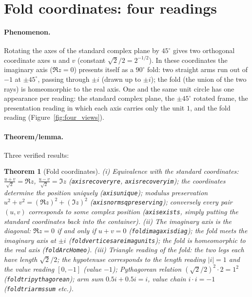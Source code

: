 \documentclass{article}
\renewcommand{\_}{\underscoreOrig\allowbreak}
\newtheorem{theorem}{Theorem}[section]
\begin{document}
\section{Fold coordinates: four readings}
\label{sec:fold}

\paragraph{Phenomenon.} Rotating the axes of the standard complex plane
by $45^\circ$ gives two orthogonal coordinate axes $u$ and $v$ (constant
$\sqrt2/2=2^{-1/2}$). In these coordinates the imaginary axis
($\Re z=0$) presents itself as a $90^\circ$ fold: two straight arms run
out of $-1$ at $\pm45^\circ$, passing through $\pm i$ (drawn up to
$\pm i$); the fold (the union of the two rays) is homeomorphic to the
real axis. One and the same unit circle has one appearance per reading:
the standard complex plane, the $\pm45^\circ$ rotated frame, the
presentation reading in which each axis carries only the unit $1$, and
the fold reading (Figure~\ref{fig:four_views}).

\paragraph{Theorem/lemma.} Three verified results:
\begin{theorem}[Fold coordinates]
\label{thm:fold}
(i) Equivalence with the standard coordinates:
$\frac{u+v}{\sqrt2}=\Re z$, $\frac{u-v}{\sqrt2}=\Im z$
(\texttt{axis\_recovery\_re}, \texttt{axis\_recovery\_im}); the
coordinates determine the position uniquely (\texttt{axis\_unique});
modulus preservation $u^2+v^2=(\Re z)^2+(\Im z)^2$
(\texttt{axis\_norm\_sq\_preserving}); conversely every pair $(u,v)$
corresponds to some complex position (\texttt{axis\_exists}, simply
putting the standard coordinates back into the container).
(ii) The imaginary axis is the diagonal: $\Re z=0$ if and only if
$u+v=0$ (\texttt{fold\_imag\_axis\_diag}); the fold meets the imaginary
axis at $\pm i$ (\texttt{fold\_vertices\_are\_imag\_units}); the fold is
homeomorphic to the real axis (\texttt{foldArcHomeo}).
(iii) Triangle reading of the fold: the two legs each have length
$\sqrt2/2$; the hypotenuse corresponds to the length reading $|i|=1$ and
the value reading $[0,-1]$ (value $-1$); Pythagorean relation
$(\sqrt2/2)^2\cdot2=1^2$ (\texttt{fold\_tri\_pythagorean}); arm sum
$0.5i+0.5i=i$, value chain $i\cdot i=-1$
(\texttt{fold\_tri\_arms\_sum} etc.).
\end{theorem}
\end{document}
